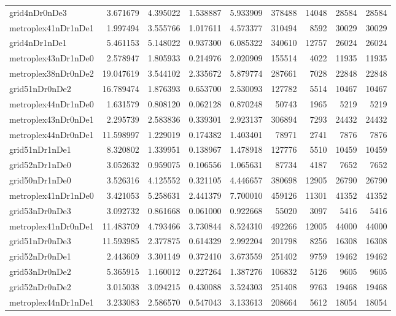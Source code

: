 \begin{longtable}{|l|r|r|r|r|r|r|r|r|}
grid4nDr0nDe3 & 3.671679 & 4.395022 & 1.538887 & 5.933909 & 378488 & 14048 & 28584 & 28584 \\
metroplex41nDr1nDe1 & 1.997494 & 3.555766 & 1.017611 & 4.573377 & 310494 & 8592 & 30029 & 30029 \\
grid4nDr1nDe1 & 5.461153 & 5.148022 & 0.937300 & 6.085322 & 340610 & 12757 & 26024 & 26024 \\
metroplex43nDr1nDe0 & 2.578947 & 1.805933 & 0.214976 & 2.020909 & 155514 & 4022 & 11935 & 11935 \\
metroplex38nDr0nDe2 & 19.047619 & 3.544102 & 2.335672 & 5.879774 & 287661 & 7028 & 22848 & 22848 \\
grid51nDr0nDe2 & 16.789474 & 1.876393 & 0.653700 & 2.530093 & 127782 & 5514 & 10467 & 10467 \\
metroplex44nDr1nDe0 & 1.631579 & 0.808120 & 0.062128 & 0.870248 & 50743 & 1965 & 5219 & 5219 \\
metroplex43nDr0nDe1 & 2.295739 & 2.583836 & 0.339301 & 2.923137 & 306894 & 7293 & 24432 & 24432 \\
metroplex44nDr0nDe1 & 11.598997 & 1.229019 & 0.174382 & 1.403401 & 78971 & 2741 & 7876 & 7876 \\
grid51nDr1nDe1 & 8.320802 & 1.339951 & 0.138967 & 1.478918 & 127776 & 5510 & 10459 & 10459 \\
grid52nDr1nDe0 & 3.052632 & 0.959075 & 0.106556 & 1.065631 & 87734 & 4187 & 7652 & 7652 \\
grid50nDr1nDe0 & 3.526316 & 4.125552 & 0.321105 & 4.446657 & 380698 & 12905 & 26790 & 26790 \\
metroplex41nDr1nDe0 & 3.421053 & 5.258631 & 2.441379 & 7.700010 & 459126 & 11301 & 41352 & 41352 \\
grid53nDr0nDe3 & 3.092732 & 0.861668 & 0.061000 & 0.922668 & 55020 & 3097 & 5416 & 5416 \\
metroplex41nDr0nDe1 & 11.483709 & 4.793466 & 3.730844 & 8.524310 & 492266 & 12005 & 44000 & 44000 \\
grid51nDr0nDe3 & 11.593985 & 2.377875 & 0.614329 & 2.992204 & 201798 & 8256 & 16308 & 16308 \\
grid52nDr0nDe1 & 2.443609 & 3.301149 & 0.372410 & 3.673559 & 251402 & 9759 & 19462 & 19462 \\
grid53nDr0nDe2 & 5.365915 & 1.160012 & 0.227264 & 1.387276 & 106832 & 5126 & 9605 & 9605 \\
grid52nDr0nDe2 & 3.015038 & 3.094215 & 0.430088 & 3.524303 & 251408 & 9763 & 19468 & 19468 \\
metroplex44nDr1nDe1 & 3.233083 & 2.586570 & 0.547043 & 3.133613 & 208664 & 5612 & 18054 & 18054 \\

\end{longtable}
